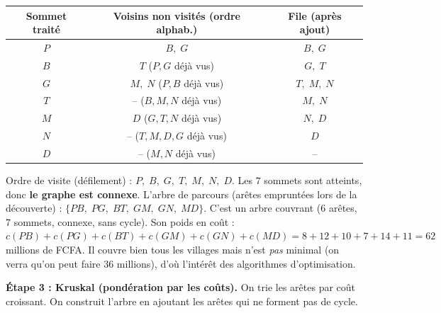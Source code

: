 \documentclass[11pt]{article}
\begin{document}
\begin{exoresolu}
\begin{center}
\begin{tabular}{|c|c|c|}
\hline
\rowcolor{popblueL} \textbf{Sommet traité} & \textbf{Voisins non visités (ordre alphab.)} & \textbf{File (après ajout)} \\
\hline
$P$ & $B,\; G$ & $B,\; G$ \\
\hline
$B$ & $T$ ($P,G$ déjà vus) & $G,\; T$ \\
\hline
$G$ & $M,\; N$ ($P,B$ déjà vus) & $T,\; M,\; N$ \\
\hline
$T$ & -- ($B,M,N$ déjà vus) & $M,\; N$ \\
\hline
$M$ & $D$ ($G,T,N$ déjà vus) & $N,\; D$ \\
\hline
$N$ & -- ($T,M,D,G$ déjà vus) & $D$ \\
\hline
$D$ & -- ($M,N$ déjà vus) & -- \\
\hline
\end{tabular}
\end{center}

Ordre de visite (défilement) : $P,\; B,\; G,\; T,\; M,\; N,\; D$.
Les $7$ sommets sont atteints, donc \textbf{le graphe est connexe}.
L'arbre de parcours (arêtes empruntées lors de la découverte) : $\{PB,\; PG,\; BT,\; GM,\; GN,\; MD\}$.
C'est un arbre couvrant (6 arêtes, 7 sommets, connexe, sans cycle).
Son poids en coût : $c(PB)+c(PG)+c(BT)+c(GM)+c(GN)+c(MD) = 8+12+10+7+14+11 = 62$ millions de FCFA.
Il couvre bien tous les villages mais n'est \emph{pas} minimal (on verra qu'on peut faire 36 millions), d'où l'intérêt des algorithmes d'optimisation.

\textbf{Étape 3 : Kruskal (pondération par les coûts).}
On trie les arêtes par coût croissant. On construit l'arbre en ajoutant les arêtes qui ne forment pas de cycle.


\end{exoresolu}
\end{document}

